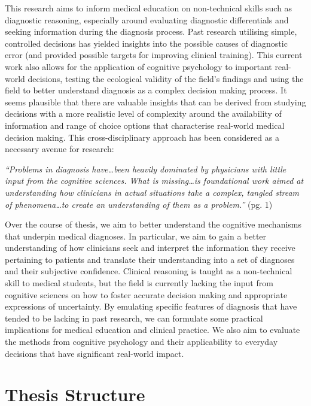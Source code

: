 \documentclass[a4paper, nobind]{templates/ociamthesis}
\begin{document}
\hfill\break
This research aims to inform medical education on non-technical skills such as diagnostic reasoning, especially around evaluating diagnostic differentials and seeking information during the diagnosis process. Past research utilising simple, controlled decisions has yielded insights into the possible causes of diagnostic error (and provided possible targets for improving clinical training). This current work also allows for the application of cognitive psychology to important real-world decisions, testing the ecological validity of the field's findings and using the field to better understand diagnosis as a complex decision making process. It seems plausible that there are valuable insights that can be derived from studying decisions with a more realistic level of complexity around the availability of information and range of choice options that characterise real-world medical decision making. This cross-disciplinary approach has been considered as a necessary avenue for research:

\hfill\break
\emph{``Problems in diagnosis have\ldots been heavily dominated by physicians with little input from the cognitive sciences. What is missing\ldots is foundational work aimed at understanding how clinicians in actual situations take a complex, tangled stream of phenomena\ldots to create an understanding of them as a problem.''} \autocite{wears_diagnosing_2014} (pg. 1)

\hfill\break
Over the course of thesis, we aim to better understand the cognitive mechanisms that underpin medical diagnoses. In particular, we aim to gain a better understanding of how clinicians seek and interpret the information they receive pertaining to patients and translate their understanding into a set of diagnoses and their subjective confidence. Clinical reasoning is taught as a non-technical skill to medical students, but the field is currently lacking the input from cognitive sciences on how to foster accurate decision making and appropriate expressions of uncertainty. By emulating specific features of diagnosis that have tended to be lacking in past research, we can formulate some practical implications for medical education and clinical practice. We also aim to evaluate the methods from cognitive psychology and their applicability to everyday decisions that have significant real-world impact.

\newpage

\section{Thesis Structure}\label{thesis-structure}
\end{document}
